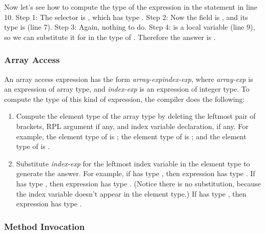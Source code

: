 Now let's see how to compute the type of the expression in the
 statement in line 10.  Step 1: The selector is ,
which has type .  Step 2: Now the field is
, and its type is  (line 7).
Step 3: Again, nothing to do.  Step 4:  is a 
local variable (line 9), so we can substitute it for  in the
type of .  Therefore the answer is
.

\subsubsection{Array Access%
\label{sec:types:exp:array}}

An array access expression has the form
\emph{array-exp}\kwd{[}\emph{index-exp}\kwd{]}, where \emph{array-exp}
is an expression of array type, and \emph{index-exp} is an expression
of integer type.  To compute the type of this kind of expression, the
compiler does the following:
%
\begin{enumerate}
%
\item Compute the element type of the array type by deleting the
  leftmost pair of brackets, RPL argument if any, and index variable
  declaration, if any.  For example, the element type of
   is ; the element type of
   is ; and the element type of
   is .
%
\item Substitute \emph{index-exp} for the leftmost index variable in
  the element type to generate the answer.  For example, if 
  has type , then expression  has
  type .  If  has type ,
  then expression  has type .  (Notice there
  is no substitution, because the index variable doesn't appear in the
  element type.)  If  has type
  , then expression  has
  type .
\end{enumerate}

\subsubsection{Method Invocation%
\label{sec:types:exp:invoke}}


